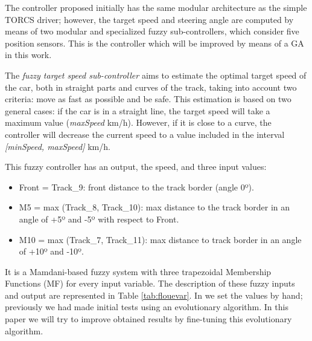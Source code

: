 \documentclass[sigconf]{acmart}
\begin{document}
The controller proposed initially \cite{evo17} has the same modular
architecture as the simple TORCS driver; however, the target speed and
steering angle are computed by means of two modular and specialized
fuzzy sub-controllers, which consider five position sensors. This is
the controller which will be improved by means of a GA in this
work.

The {\em fuzzy target speed sub-controller} aims to estimate the
optimal target speed of the car, both in straight parts and curves of
the track, taking into account two criteria: move as fast as possible
and be safe. This estimation is based on two general cases: if the car
is in a straight line, the target speed will take a maximum value
(\textit{maxSpeed} km/h). However, if it is close to a curve, the
controller will decrease the current speed to a value included in the
interval \textit{[minSpeed, maxSpeed]} km/h. 

This fuzzy controller has an output, the speed, and three input values:
\begin{itemize}
	\item Front = Track\_9: front distance to the track border (angle 0º).  %
	\item M5 = max (Track\_8, Track\_10): max distance to the track border in an angle of +5º and -5º with respect to Front.
	\item M10 = max (Track\_7, Track\_11): max distance to track border in an angle of +10º and -10º.
\end{itemize}

It is a Mamdani-based fuzzy system \cite{iancu2012} with three
trapezoidal Membership Functions (MF) for every input variable. The
description of these fuzzy inputs and output are represented in Table
\ref{tab:flouevar}. In \cite{evo17} we set the values by hand;
previously we had made initial tests using an evolutionary
algorithm. In this paper we will try to improve obtained results by
fine-tuning this evolutionary algorithm. %
\end{document}
